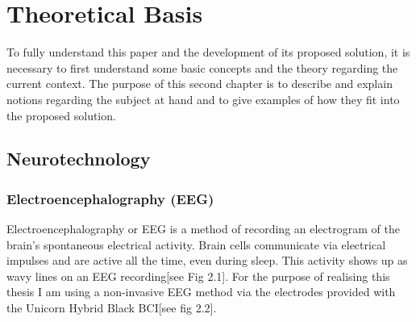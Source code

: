 
\chapter{Theoretical Basis}\label{cap:theory}
To fully understand this paper and the development of its proposed solution, it is necessary to first understand some basic concepts and the theory regarding the current context. The purpose of this second chapter is to describe and explain notions regarding the subject at hand and to give examples of how they fit into the proposed solution.


\section{Neurotechnology}
\subsection{Electroencephalography (EEG)}
Electroencephalography or EEG is a method of recording an electrogram of the brain's spontaneous electrical activity. Brain cells communicate via electrical impulses and are active all the time, even during sleep\cite{EEG_mayoclinic}. This activity shows up as wavy lines on an EEG recording[see Fig 2.1]. For the purpose of realising this thesis I am using a non-invasive EEG method via the electrodes provided with the Unicorn Hybrid Black BCI[see fig 2.2].

